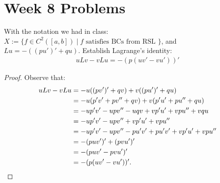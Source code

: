 \documentclass[10pt,oneside,openany]{memoir}
\begin{document}
\section*{Week 8 Problems}
\begin{exercise}[manual-num={1}]
With the notation we had in class: $X:= \{f \in C^2([a,b]) \mid f \text{ satisfies BCs from RSL }\}$, and $Lu = -((pu')' + qu)$. Establish Lagrange's identity:
    \begin{equation*}
    \begin{split}
        uLv - vLu = -(p(uv' - vu'))'
    \end{split}
    \end{equation*}
\end{exercise}
    \begin{proof}
        Observe that:
            \begin{equation*}
            \begin{split}
                uLv - vLu 
                & = -u((pv')' + qv) + v((pu')' + qu)\\
                & = -u(p'v' + pv'' + qv) + v(p'u' + pu'' + qu) \\
                & = -up'v' - upv'' - uqv + vp'u' + vpu'' + vqu \\
                & = -up'v' - upv'' + vp'u' + vpu'' \\
                & = -up'v' - upv'' - pu'v' + pu'v' + vp'u' + vpu'' \\
                & = -(puv')' + (pvu')' \\
                & = -(puv' - pvu')' \\
                & = -(p(uv' - vu'))'. \qedhere
            \end{split}
            \end{equation*}
        
    \end{proof}
\end{document}
